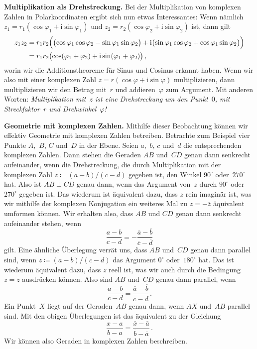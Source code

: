 \textbf{Multiplikation als Drehstreckung.}
Bei der Multiplikation von komplexen Zahlen in Polarkoordinaten ergibt sich nun etwas Interessantes: Wenn nämlich $z_1=r_1(\cos\varphi_1+\mathrm{i}\sin\varphi_1)$ und $z_2=r_2(\cos\varphi_2+\mathrm{i}\sin\varphi_2)$ ist, dann gilt
\begin{align*}
	z_1z_2&=r_1r_2\parens[\Big]{\parens[\big]{\cos\varphi_1\cos\varphi_2-\sin\varphi_1\sin\varphi_2}+\mathrm{i}\parens[\big]{\sin\varphi_1\cos\varphi_2+\cos\varphi_1\sin\varphi_2}}\\
	&=r_1r_2\parens[\big]{\cos(\varphi_1+\varphi_2)+\mathrm{i}\sin(\varphi_1+\varphi_2)}\,,
\end{align*}
worin wir die Additionstheoreme für Sinus und Cosinus erkannt haben. Wenn wir also mit einer komplexen Zahl $z=r(\cos\varphi+\mathrm{i}\sin\varphi)$ multiplizieren, dann multiplizieren wir den Betrag mit~$r$ und addieren~$\varphi$ zum Argument. Mit anderen Worten: \emph{Multiplikation mit~$z$ ist eine Drehstreckung um den Punkt~\(0\), mit Streckfaktor~$r$ und Drehwinkel~$\varphi$!}

\textbf{Geometrie mit komplexen Zahlen.}
Mithilfe dieser Beobachtung können wir effektiv Geometrie mit komplexen Zahlen betreiben. Betrachte zum Beispiel vier Punkte $A$,~$B$, $C$ und~$D$ in der Ebene. Seien $a$,~$b$, $c$ und~$d$ die entsprechenden komplexen Zahlen. Dann stehen die Geraden $AB$ und~$CD$ genau dann senkrecht aufeinander, wenn die Drehstreckung, die durch Multiplikation mit der komplexen Zahl $z\coloneqq (a-b)/(c-d)$ gegeben ist, den Winkel $90^\circ$ oder~$270^\circ$ hat. Also ist $AB\perp CD$ genau dann, wenn das Argument von~$z$ durch $90^\circ$ oder~$270^\circ$ gegeben ist. Das wiederum ist äquivalent dazu, dass $z$ rein imaginär ist, was wir mithilfe der komplexen Konjugation ein weiteres Mal zu $z=-\overline{z}$ äquivalent umformen können. Wir erhalten also, dass $AB$ und $CD$ genau dann senkrecht aufeinander stehen, wenn
\begin{equation*}
	\frac{a-b}{c-d}=-\frac{\overline{a}-\overline{b}}{\overline{c}-\overline{d}}
\end{equation*}
gilt. Eine ähnliche Überlegung verrät uns, dass $AB$ und~$CD$ genau dann parallel sind, wenn $z\coloneqq (a-b)/(c-d)$ das Argument $0^\circ$ oder~$180^\circ$ hat. Das ist wiederum äquivalent dazu, dass $z$ reell ist, was wir auch durch die Bedingung $z=\overline{z}$ ausdrücken können. Also sind $AB$ und~$CD$ genau dann parallel, wenn
\begin{equation*}
	\frac{a-b}{c-d}=\frac{\overline{a}-\overline{b}}{\overline{c}-\overline{d}}\,.
\end{equation*}
Ein Punkt~$X$ liegt auf der Geraden~$AB$ genau dann, wenn $AX$ und~$AB$ parallel sind. Mit den obigen Überlegungen ist das äquivalent zu der Gleichung
\begin{equation*}
	\frac{x-a}{b-a}=\frac{\overline{x}-\overline{a}}{\overline{b}-\overline{a}}\,.
\end{equation*}
Wir können also Geraden in komplexen Zahlen beschreiben.

